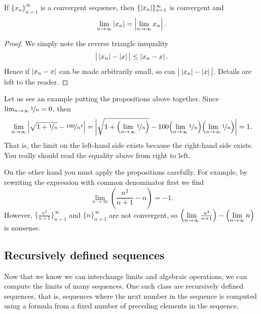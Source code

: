 \begin{prop}
If $\{ x_n \}_{n=1}^\infty$ is a convergent sequence, then $\{ \left\lvert {x_n} \right\rvert \}_{n=1}^\infty$
is convergent and
\begin{equation*}
\lim_{n\to\infty} \left\lvert {x_n} \right\rvert = 
\left\lvert {\lim_{n\to\infty} x_n} \right\rvert .
\end{equation*}
\end{prop}

\begin{proof}
We simply note the reverse triangle inequality
\begin{equation*}
\big\lvert \left\lvert {x_n} \right\rvert - \left\lvert {x} \right\rvert \big\rvert \leq \left\lvert {x_n-x} \right\rvert .
\end{equation*}
Hence if $\left\lvert {x_n -x} \right\rvert$ can be made arbitrarily small, so can
$\big\lvert \left\lvert {x_n} \right\rvert - \left\lvert {x} \right\rvert \big\rvert$.
Details are left to the reader.
\end{proof}

Let us see an example putting the propositions above together.  Since
$\lim_{n\to\infty} \nicefrac{1}{n} = 0$, then
\begin{equation*}
\lim_{n\to \infty}
\left\lvert {\sqrt{1 + \nicefrac{1}{n}} - \nicefrac{100}{n^2}} \right\rvert =  
\left\lvert {\sqrt{1 + \Bigl(\lim_{n\to\infty} \nicefrac{1}{n}\Bigr)}
- 100 \Bigl(\lim_{n\to\infty} \nicefrac{1}{n}\Bigr)\Bigl(\lim_{n\to\infty} \nicefrac{1}{n}\Bigr)} \right\rvert = 1.
\end{equation*}
That is, the limit on the left-hand side exists because the right-hand
side exists.  You really should read the equality above from right to left.

On the other hand you must apply the propositions carefully.
For example, by rewriting the expression with common denominator first
we find
\begin{equation*}
\lim_{n\to \infty} \left( \frac{n^2}{n+1} - n \right)
= -1 .
\end{equation*}
However, 
$\bigl\{ \frac{n^2}{n+1} \bigr\}_{n=1}^\infty$ and 
$\{n\}_{n=1}^\infty$ are not convergent,
so
$\Bigl(\lim\limits_{n\to\infty} \frac{n^2}{n+1}\Bigr) -
\Bigl(\lim\limits_{n\to\infty} n\Bigr)$ is nonsense.

\subsection{Recursively defined sequences}

Now that we know we can interchange limits and algebraic operations, we can
compute the limits of many sequences.
One such class are recursively defined sequences, that is, sequences where
the next number in the sequence is computed using a formula from a fixed number
of preceding elements in the sequence.

